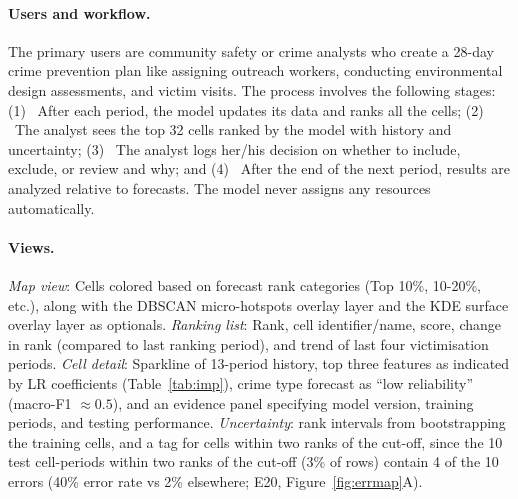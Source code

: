 \documentclass[11pt,a4paper]{report}
\begin{document}
\paragraph{Users and workflow.} The primary users are community safety or crime analysts who create a 28-day crime prevention plan like assigning outreach workers, conducting environmental design assessments, and victim visits. The process involves the following stages: (1) ~After each period, the model updates its data and ranks all the cells; (2) ~The analyst sees the top 32 cells ranked by the model with history and uncertainty; (3) ~The analyst logs her/his decision on whether to include, exclude, or review and why; and (4) ~After the end of the next period, results are analyzed relative to forecasts. The model never assigns any resources automatically.

\paragraph{Views.} \emph{Map view}: Cells colored based on forecast rank categories (Top 10\%, 10-20\%, etc.), along with the DBSCAN micro-hotspots overlay layer and the KDE surface overlay layer as optionals. \emph{Ranking list}: Rank, cell identifier/name, score, change in rank (compared to last ranking period), and trend of last four victimisation periods. \emph{Cell detail}: Sparkline of 13-period history, top three features as indicated by LR coefficients (Table~\ref{tab:imp}), crime type forecast as ``low reliability'' (macro-F1 $\approx0.5$), and an evidence panel specifying model version, training periods, and testing performance. \emph{Uncertainty}: rank intervals from bootstrapping the training cells, and a tag for cells within two ranks of the cut-off, since the 10 test cell-periods within two ranks of the cut-off (3\% of rows) contain 4 of the 10 errors (40\% error rate vs 2\% elsewhere; E20, Figure~\ref{fig:errmap}A).
\end{document}
